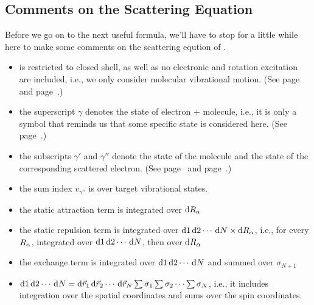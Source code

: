 \documentclass[aps,pra,groupedaddress,12pt,
               amsfonts,amssymb,
               preprint
    ]{revtex4}
\begin{document}
\subsection{Comments on the Scattering Equation}
\label{sec:comm-scatt-equat}
Before we go on to the next useful formula, we'll have to stop for a
little while here to make some comments on the scattering eqution of
.
\begin{itemize}
\item {} is restricted to closed shell, as well as no electronic
  and rotation excitation are included, i.e., we only consider molecular
  vibrational motion. (See page~\pageref{com:norot} and
  page~\pageref{com:state}.)
\item the superscript $\gamma$ denotes the state of electron $+$
  molecule, i.e., it is only a symbol that reminds us that some specific
  state is considered here. (See page~\pageref{eq:emw}.)
\item the subscripts $\gamma'$ and $\gamma''$ denote the state of the
  molecule and the state of the corresponding scattered electron. (See
  page~\pageref{eq:emw} and page~\pageref{eq:int1}.)
\item the sum index $v_{\gamma''}$ is over target vibrational states.
\item the static attraction term is integrated over $\mathrm{d}R_\alpha$
\item the static repulsion term is integrated over $\mathrm{d} 1\,\mathrm{d}
  2\cdots\,\mathrm{d} N\times\mathrm{d}R_\alpha$, i.e., for every $R_\alpha$, integrated over
  $\mathrm{d} 1\,\mathrm{d} 2\cdots\,\mathrm{d} N$, then over $\mathrm{d}R_\alpha$
\item the exchange term is integrated over $\mathrm{d} 1\,\mathrm{d} 2\cdots\,\mathrm{d} N$ and
  summed over $\sigma_{N+1}$
\item $\mathrm{d} 1\,\mathrm{d} 2\cdots\,\mathrm{d} N =
  \mathrm{d}\vec{r}_1\,\mathrm{d}\vec{r}_2\cdots\,\mathrm{d}\vec{r}_N
  \sum\sigma_1\sum\sigma_2\cdots\sum\sigma_N$, i.e., it includes
  integration over the spatial coordinates and sums over the spin
  coordinates. 
\end{itemize}
\end{document}
